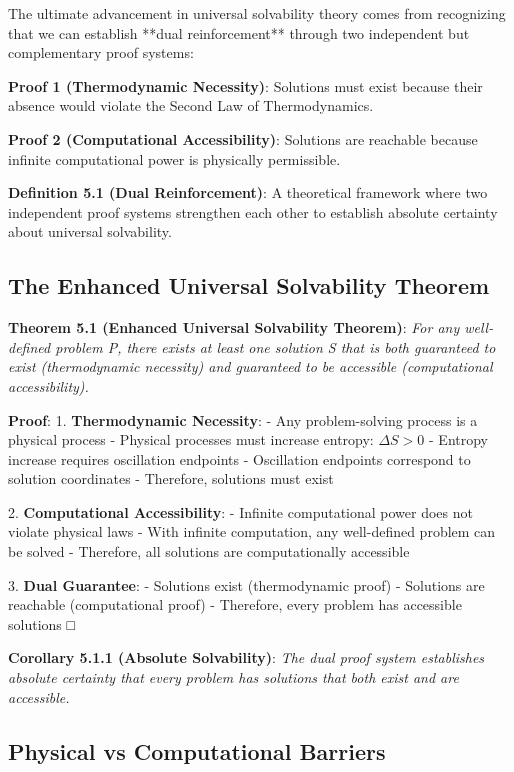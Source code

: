 \documentclass[12pt,a4paper]{article}
\theoremstyle{definition}
\begin{document}
{The ultimate advancement in universal solvability theory comes from recognizing that we can establish **dual reinforcement** through two independent but complementary proof systems:

\textbf{Proof 1 (Thermodynamic Necessity)}: Solutions must exist because their absence would violate the Second Law of Thermodynamics.

\textbf{Proof 2 (Computational Accessibility)}: Solutions are reachable because infinite computational power is physically permissible.

\textbf{Definition 5.1 (Dual Reinforcement)}: A theoretical framework where two independent proof systems strengthen each other to establish absolute certainty about universal solvability.

\subsection{The Enhanced Universal Solvability Theorem}

\textbf{Theorem 5.1 (Enhanced Universal Solvability Theorem)}: \textit{For any well-defined problem P, there exists at least one solution S that is both guaranteed to exist (thermodynamic necessity) and guaranteed to be accessible (computational accessibility).}

\textbf{Proof}:
1. \textbf{Thermodynamic Necessity}:
   - Any problem-solving process is a physical process
   - Physical processes must increase entropy: $\Delta S > 0$
   - Entropy increase requires oscillation endpoints
   - Oscillation endpoints correspond to solution coordinates
   - Therefore, solutions must exist

2. \textbf{Computational Accessibility}:
   - Infinite computational power does not violate physical laws
   - With infinite computation, any well-defined problem can be solved
   - Therefore, all solutions are computationally accessible

3. \textbf{Dual Guarantee}:
   - Solutions exist (thermodynamic proof)
   - Solutions are reachable (computational proof)
   - Therefore, every problem has accessible solutions □

\textbf{Corollary 5.1.1 (Absolute Solvability)}: \textit{The dual proof system establishes absolute certainty that every problem has solutions that both exist and are accessible.}

\subsection{Physical vs Computational Barriers}

}
\end{document}
